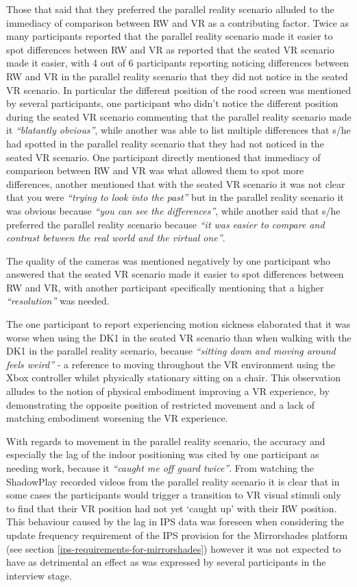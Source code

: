 Those that said that they preferred the parallel reality scenario alluded to the immediacy of comparison between RW and VR as a contributing factor. Twice as many participants reported that the parallel reality scenario made it easier to spot differences between RW and VR as reported that the seated VR scenario made it easier, with 4 out of 6 participants reporting noticing differences between RW and VR in the parallel reality scenario that they did not notice in the seated VR scenario. In particular the different position of the rood screen was mentioned by several participants, one participant who didn't notice the different position during the seated VR scenario commenting that the parallel reality scenario made it \textit{``blatantly obvious''}, while another was able to list multiple differences that s/he had spotted in the parallel reality scenario that they had not noticed in the seated VR scenario. One participant directly mentioned that immediacy of comparison between RW and VR was what allowed them to spot more differences, another mentioned that with the seated VR scenario it was not clear that you were \textit{``trying to look into the past''} but in the parallel reality scenario it was obvious because \textit{``you can see the differences''}, while another said that s/he preferred the parallel reality scenario because \textit{``it was easier to compare and contrast between the real world and the virtual one''}.

The quality of the cameras was mentioned negatively by one participant who answered that the seated VR scenario made it easier to spot differences between RW and VR, with another participant specifically mentioning that a higher \textit{``resolution''} was needed.

The one participant to report experiencing motion sickness elaborated that it was worse when using the DK1 in the seated VR scenario than when walking with the DK1 in the parallel reality scenario, because \textit{``sitting down and moving around feels weird''} - a reference to moving throughout the VR environment using the Xbox controller whilst physically stationary sitting on a chair. This observation alludes to the notion of physical embodiment improving a VR experience, by demonstrating the opposite position of restricted movement and a lack of matching embodiment worsening the VR experience.

With regards to movement in the parallel reality scenario, the accuracy and especially the lag of the indoor positioning was cited by one participant as needing work, because it \textit{``caught me off guard twice''}. From watching the ShadowPlay recorded videos from the parallel reality scenario it is clear that in some cases the participants would trigger a transition to VR visual stimuli only to find that their VR position had not yet `caught up' with their RW position. This behaviour caused by the lag in IPS data was foreseen when considering the update frequency requirement of the IPS provision for the Mirrorshades platform (see section \ref{ips-requirements-for-mirrorshades}) however it was not expected to have as detrimental an effect as was expressed by several participants in the interview stage.

